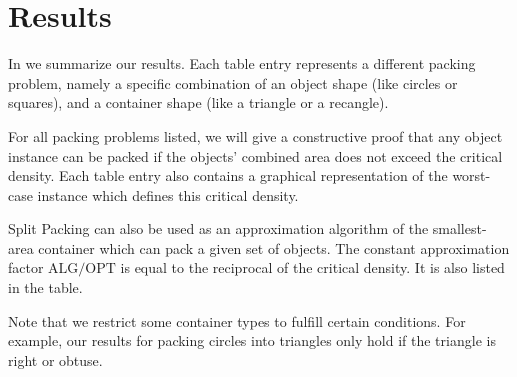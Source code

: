 \documentclass[a4paper,style=print,bibliography=totoc,nexus,lnum,extramargin]{tubsbook}
\begin{document}



\section{Results}

In  we summarize our results. Each table entry represents a different packing problem, namely a specific combination of an object shape (like circles or squares), and a container shape (like a triangle or a recangle).

For all packing problems listed, we will give a constructive proof that any object instance can be packed if the objects' combined area does not exceed the critical density. Each table entry also contains a graphical representation of the worst-case instance which defines this critical density.

Split Packing can also be used as an approximation algorithm of the smallest-area container which can pack a given set of objects. The constant approximation factor $\text{ALG}/\text{OPT}$ is equal to the reciprocal of the critical density. It is also listed in the table.

Note that we restrict some container types to fulfill certain conditions. For example, our results for packing circles into triangles only hold if the triangle is right or obtuse.
\end{document}
